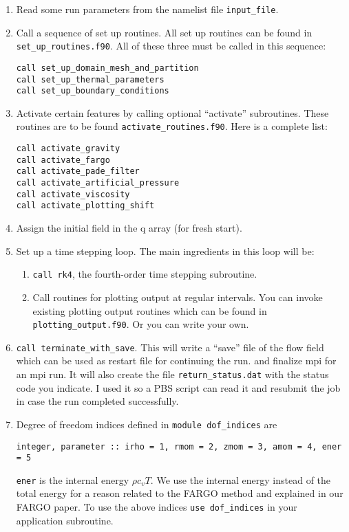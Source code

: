 \documentclass[11pt]{amsart}
\begin{document}
\begin{enumerate}
\item Read some run parameters from the namelist file {\tt input\_file}.
\item Call a sequence of set up routines.  All set up routines can be found in {\tt set\_up\_routines.f90}.  All of these three must
be called in this sequence:
\begin{verbatim}
call set_up_domain_mesh_and_partition
call set_up_thermal_parameters
call set_up_boundary_conditions
\end{verbatim}
\item Activate certain features by calling optional ``activate'' subroutines.  These routines are to be found {\tt activate\_routines.f90}.
Here is a complete list:
\begin{verbatim}
call activate_gravity
call activate_fargo
call activate_pade_filter
call activate_artificial_pressure
call activate_viscosity
call activate_plotting_shift
\end{verbatim}
\item Assign the initial field in the q array (for fresh start).

\item Set up a time stepping loop.  The main ingredients in this loop
will be:
\begin{enumerate}
\item {\tt call rk4}, the fourth-order time stepping subroutine.
\item Call routines for plotting output at regular intervals.  You can
invoke existing plotting output routines which can be found in
{\tt plotting\_output.f90}.  Or you can write your own.
\end{enumerate}
\item {\tt call terminate\_with\_save}.  This will write a ``save'' file of the flow
field which can be used as restart file for continuing the run.
and finalize mpi for an mpi run.  It will also create the file {\tt return\_status.dat}
with the status code you indicate.  I used it so a PBS script can read it and
resubmit the job in case the run completed successfully.

\item Degree of freedom indices defined in {\tt module dof\_indices} are
\begin{verbatim}
integer, parameter :: irho = 1, rmom = 2, zmom = 3, amom = 4, ener = 5
\end{verbatim}
{\tt ener} is the internal energy $\rho c_v T$.  We use the internal energy instead of the total energy for a reason related to the FARGO method and explained in our FARGO paper.
To use the above indices {\tt use dof\_indices} in your application subroutine.
\end{enumerate}
\end{document}
